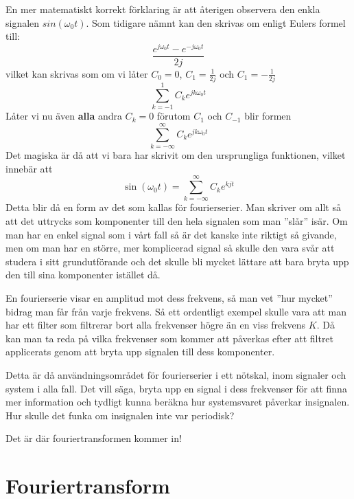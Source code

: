\documentclass{article}
\begin{document}
En mer matematiskt korrekt förklaring är att återigen observera den enkla
signalen $sin(\omega_0 t)$. Som tidigare nämnt kan den skrivas om enligt Eulers
formel till:
$$\frac{e^{j \omega_0 t} - e^{-j \omega_0 t}}{2j}$$
vilket kan skrivas som om vi låter $C_0=0$, $C_{1}=\frac{1}{2j}$ och
$C_{1}=-\frac{1}{2j}$
$$\sum_{k=-1}^1 C_k e^{j k \omega_0 t}$$
Låter vi nu även \textbf{alla} andra $C_k = 0$ förutom  $C_1$ och $C_{-1}$ blir formen
$$\sum_{k=-\infty}^{\infty} C_k e^{j k \omega_0 t}$$
Det magiska är då att vi bara har skrivit om den ursprungliga funktionen,
vilket innebär att
$$\sin(\omega_0 t) = \sum_{k=-\infty}^{\infty} C_k e^{k j t}$$
Detta blir då en form av det som kallas för fourierserier.
Man skriver om allt så att det uttrycks som komponenter till den hela signalen
som man ''slår'' isär. Om man har en enkel signal som i vårt fall så är det
kanske inte riktigt så givande, men om man har en större,
mer komplicerad signal så skulle den vara svår att studera i sitt
grundutförande och det skulle bli mycket lättare att bara bryta upp den
till sina komponenter istället då.

En fourierserie visar en amplitud mot dess frekvens, så man vet
''hur mycket'' bidrag man får från varje frekvens.
Så ett ordentligt exempel skulle vara att man har ett filter som
filtrerar bort alla frekvenser högre än en viss frekvens $K$.
Då kan man ta reda på vilka frekvenser som kommer att påverkas
efter att filtret applicerats genom att bryta upp signalen till dess komponenter.

Detta är då användningsområdet för fourierserier i ett nötskal,
inom signaler och system i alla fall.
Det vill säga, bryta upp en signal i dess frekvenser för att finna mer
information och tydligt kunna beräkna hur systemsvaret påverkar insignalen.
Hur skulle det funka om insignalen inte var periodisk?

Det är där fouriertransformen kommer in!

\section{Fouriertransform}
\end{document}
